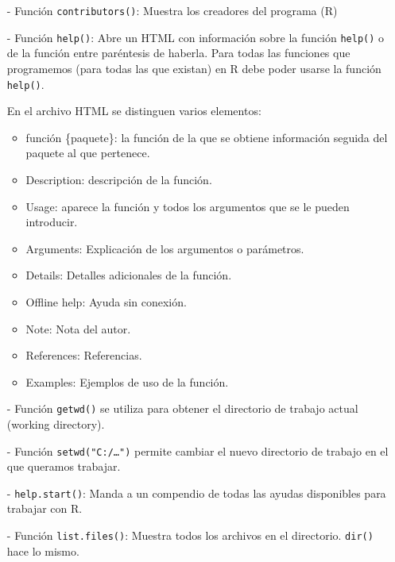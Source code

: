 \documentclass[a4paper, 12pt]{article}
\begin{document}
	\begin{itemize}
		\item[-]Función \texttt{contributors()}: Muestra los creadores del programa (R)
		
		\item[-]Función \texttt{help()}: Abre un HTML con información sobre la función \texttt{help()} o de la función entre paréntesis de haberla. Para todas las funciones que programemos (para todas las que existan) en R debe poder usarse la función \texttt{help()}.
		
		En el archivo HTML se distinguen varios elementos:
		
		\begin{itemize}
			\item función \{paquete\}: la función de la que se obtiene información seguida del paquete al que pertenece.
			\item Description: descripción de la función.
			\item Usage: aparece la función y todos los argumentos que se le pueden introducir.
			\item Arguments: Explicación de los argumentos o parámetros.
			\item Details: Detalles adicionales de la función.
			\item Offline help: Ayuda sin conexión.
			\item Note: Nota del autor.
			\item References: Referencias.
			\item Examples: Ejemplos de uso de la función.
		\end{itemize}
		
		\item[-]Función \texttt{getwd()} se utiliza para obtener el directorio de trabajo actual (working directory).
		
		\item[-]Función \texttt{setwd(\string"C:/…")} permite cambiar el nuevo directorio de trabajo en el que queramos trabajar.
		
		\item[-] \texttt{help.start()}: Manda a un compendio de todas las ayudas disponibles para trabajar con R.
		
		\item[-]Función \texttt{list.files()}: Muestra todos los archivos en el directorio. \texttt{dir()} hace lo mismo. 
	\end{itemize}
	
	\newpage
	
\end{document}
